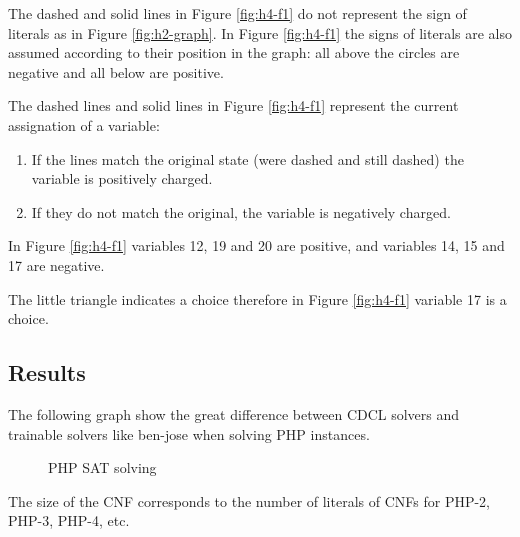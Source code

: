 \documentclass{easychair}
\begin{document}
The dashed and solid lines in Figure \ref{fig:h4-f1} do not represent the sign of literals as in Figure \ref{fig:h2-graph}. In Figure \ref{fig:h4-f1} the signs of literals are also assumed according to their position in the graph: all above the circles are negative and all below are positive. 

The dashed lines and solid lines in Figure \ref{fig:h4-f1} represent the current assignation of a variable: 

\begin{enumerate}
\item
If the lines match the original state (were dashed and still dashed) the variable is positively charged.

\item
If they do not match the original, the variable is negatively charged.
\end{enumerate}

In Figure \ref{fig:h4-f1} variables 12, 19 and 20 are positive, and variables 14, 15 and 17 are negative.

The little triangle indicates a choice therefore in Figure \ref{fig:h4-f1} variable 17 is a choice.

\subsection{Results}
\label{subsect:results}

The following graph show the great difference between CDCL solvers and trainable solvers like ben-jose when solving PHP instances.

\begin{figure}[H]
	\begin{centering}
		\caption{PHP SAT solving}
		\label{fig:results-1}
	\end{centering}
\end{figure}

The size of the CNF corresponds to the number of literals of CNFs for PHP-2, PHP-3, PHP-4, etc. 
\end{document}
